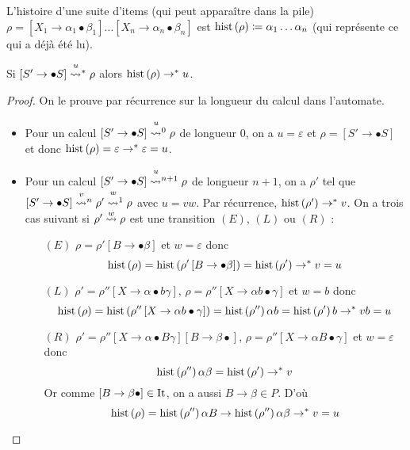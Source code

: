 \documentclass[../../agregation.tex]{subfiles}
\begin{document}
\begin{defn}[Histoire]
	
	L'histoire d'une suite d'items (qui peut apparaître dans la pile)
	$\rho=\left[X_{1}\to\alpha_{1}\bullet\beta_{1}\right]\dots\left[X_{n}\to\alpha_{n}\bullet\beta_{n}\right]$
	est $\operatorname{hist}\left(\rho\right)\coloneqq\alpha_{1}\dots\alpha_{n}$ (qui représente
	ce qui a déjà été lu).\end{defn}
\begin{lem}
	Si $\left[S'\to\bullet S\right]\transitionn u*\rho$ alors $\operatorname{hist}\left(\rho\right)\to^{*}u$.\label{lem:hist}\end{lem}
\begin{proof}
	On le prouve par récurrence sur la longueur du calcul dans l'automate.
	\begin{itemize}
		\item Pour un calcul $\left[S'\to\bullet S\right]\transitionn u0\rho$ de
		longueur $0$, on a $u=\varepsilon$ et $\rho=\left[S'\to\bullet S\right]$
		et donc $\operatorname{hist}\left(\rho\right)=\varepsilon\to^{*}\varepsilon=u$.
		\item Pour un calcul $\left[S'\to\bullet S\right]\transitionn u{n+1}\rho$
		de longueur $n+1$, on a $\rho'$ tel que $\left[S'\to\bullet S\right]\transitionn vn\rho'\transitionn w1\rho$
		avec $u=vw$. Par récurrence, $\operatorname{hist}\left(\rho'\right)\to^{*}v$. On a trois
		cas suivant si $\rho'\overset{w}{\leadsto}\rho$ est une transition $(E)$,
		$(L)$ ou $(R)$ :
		
		\begin{itemize}
			\item[$(E)$]  $\rho=\rho'\left[B\to\bullet\beta\right]$ et $w=\varepsilon$ donc
			\[
			\operatorname{hist}\left(\rho\right)=\operatorname{hist}\left(\rho'\left[B\to\bullet\beta\right]\right)=\operatorname{hist}\left(\rho'\right)\to^{*}v=u
			\]
			
			\item[$(L)$]  $\rho'=\rho''\left[X\to\alpha\bullet b\gamma\right]$, $\rho=\rho''\left[X\to\alpha b\bullet\gamma\right]$
			et $w=b$ donc
			\[
			\operatorname{hist}\left(\rho\right)=\operatorname{hist}\left(\rho''\left[X\to\alpha b\bullet\gamma\right]\right)=\operatorname{hist}\left(\rho''\right)\alpha b=\operatorname{hist}\left(\rho'\right)b\to^{*}vb=u
			\]
			
			\item[$(R)$]  $\rho'=\rho''\left[X\to\alpha\bullet B\gamma\right]\left[B\to\beta\bullet\right]$,
			$\rho=\rho''\left[X\to\alpha B\bullet\gamma\right]$ et $w=\varepsilon$
			donc
			\[
			\operatorname{hist}\left(\rho''\right)\alpha\beta=\operatorname{hist}\left(\rho'\right)\to^{*}v
			\]
			Or comme $\left[B\to\beta\bullet\right]\in\operatorname{It}$, on a aussi $B\to\beta\in P$.
			D'où
			\[
			\operatorname{hist}\left(\rho\right)=\operatorname{hist}\left(\rho''\right)\alpha B\to\operatorname{hist}\left(\rho''\right)\alpha\beta\to^{*}v=u
			\]
			
		\end{itemize}
	\end{itemize}
\end{proof}
\end{document}
